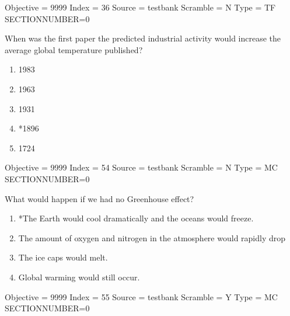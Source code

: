 \documentclass[11pt]{article}
\begin{document}
\begin{enumerate}
\begin{minipage}{\textwidth}
\begin{minipage}{\textwidth}
Objective = 9999
Index = 36
Source = testbank
Scramble = N
Type = TF
SECTIONNUMBER=0
\end{minipage}
\end{minipage}
\vskip 0.20in

\begin{minipage}{\textwidth}
\begin{minipage}{\textwidth}
\item When was the first paper the predicted industrial activity would increase the average global temperature published?
\begin{multicols}{3}
\begin{enumerate} 
\setlength{\itemsep}{1pt} 
\setlength{\parskip}{0pt} 
\setlength{\parsep}{0pt}
\setlength{\multicolsep}{1pt} 
\item 1983
\item 1963
\item 1931
\item *1896
\item 1724
\end{enumerate} 
\vfill 
\end{multicols}

Objective = 9999
Index = 54
Source = testbank
Scramble = N
Type = MC
SECTIONNUMBER=0
\end{minipage}
\end{minipage}
\vskip 0.20in

\begin{minipage}{\textwidth}
\begin{minipage}{\textwidth}
\item What would happen if we had no Greenhouse effect?
\begin{enumerate} 
\setlength{\itemsep}{1pt} 
\setlength{\parskip}{0pt} 
\setlength{\parsep}{0pt}
\setlength{\multicolsep}{1pt} 
\item *The Earth would cool dramatically and the oceans would freeze.
\item The amount of oxygen and nitrogen in the atmosphere would rapidly drop
\item The ice caps would melt.
\item Global warming would still occur.
\end{enumerate} 
Objective = 9999
Index = 55
Source = testbank
Scramble = Y
Type = MC
SECTIONNUMBER=0
\end{minipage}
\end{minipage}
\vskip 0.20in


\end{enumerate}
\end{document}
